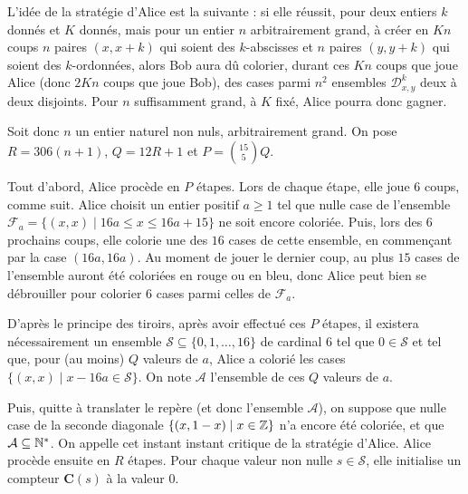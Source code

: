 \begin{sol}[105]
\begin{center}
\end{center}

L'idée de la stratégie d'Alice est la suivante : si elle réussit, pour deux entiers $k$ donnés et $K$ donnés, mais pour un entier $n$ arbitrairement grand, à créer
en $K n$ coups $n$ paires $(x,x+k)$ qui soient des $k$-abscisses et $n$ paires $(y,y+k)$ qui soient des $k$-ordonnées,
alors Bob aura dû colorier, durant ces $K n$ coups que joue Alice (donc $2 K n$ coups que joue Bob),
des cases parmi $n^2$ ensembles $\mathcal{D}_{x,y}^k$ deux à deux disjoints. Pour $n$ suffisamment grand, à $K$ fixé, Alice pourra donc gagner.

\medskip

Soit donc $n$ un entier naturel non nuls, arbitrairement grand. On pose
$R = 306 (n+1)$, $Q = 12 R+1$ et $P = \binom{15}{5} Q$.

Tout d'abord, Alice procède en $P$ étapes. Lors de chaque étape, elle joue $6$ coups, comme suit.
Alice choisit un entier positif $a \geq 1$ tel que nulle case de l'ensemble $\mathcal{F}_a = \{(x,x) \mid 16 a \leq x \leq 16 a + 15\}$ ne soit encore coloriée.
Puis, lors des $6$ prochains coups, elle colorie une des $16$ cases de cette ensemble, en commençant par la case $(16 a,16 a)$.
Au moment de jouer le dernier coup, au plus $15$ cases
de l'ensemble auront été coloriées en rouge ou en bleu, donc Alice peut bien se débrouiller pour colorier $6$ cases parmi celles de $\mathcal{F}_a$.

D'après le principe des tiroirs,
après avoir effectué ces $P$ étapes, il existera nécessairement un ensemble
$\mathcal{S} \subseteq \{0,1,\ldots,16\}$ de cardinal $6$
tel que $0 \in \mathcal{S}$ et tel que, pour (au moins) $Q$ valeurs de $a$, Alice a colorié les cases
$\{(x,x) \mid x - 16 a \in \mathcal{S}\}$. On note $\mathcal{A}$ l'ensemble de ces $Q$ valeurs de $a$.

Puis, quitte à translater le repère (et donc l'ensemble $\mathcal{A}$), on suppose que nulle case
de la seconde diagonale $\{(x,1-x) \mid x \in \mathbb Z\}$ n'a encore été coloriée, et que $\mathcal{A} \subseteq \mathbb{N}^\ast$.
On appelle cet instant \og{}instant critique\fg{} de la stratégie d'Alice.
Alice procède ensuite en $R$ étapes.
Pour chaque valeur non nulle $s \in \mathcal{S}$, elle initialise un compteur $\mathbf{C}(s)$ à la valeur $0$.


\end{sol}
